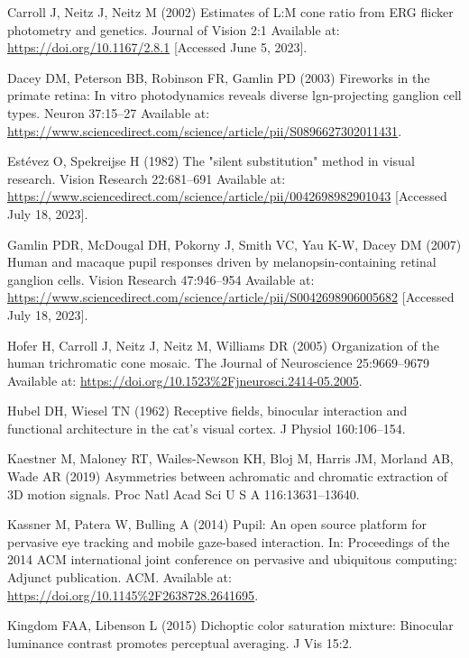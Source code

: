 \documentclass[
]{article}
\begin{document}
\leavevmode\hypertarget{ref-Carroll2002}{}%
Carroll J, Neitz J, Neitz M (2002) Estimates of L:M cone ratio from ERG flicker photometry and genetics. Journal of Vision 2:1 Available at: \url{https://doi.org/10.1167/2.8.1} {[}Accessed June 5, 2023{]}.

\leavevmode\hypertarget{ref-Dacey2003}{}%
Dacey DM, Peterson BB, Robinson FR, Gamlin PD (2003) Fireworks in the primate retina: In vitro photodynamics reveals diverse lgn-projecting ganglion cell types. Neuron 37:15--27 Available at: \url{https://www.sciencedirect.com/science/article/pii/S0896627302011431}.

\leavevmode\hypertarget{ref-Estevez1982}{}%
Estévez O, Spekreijse H (1982) The "silent substitution" method in visual research. Vision Research 22:681--691 Available at: \url{https://www.sciencedirect.com/science/article/pii/0042698982901043} {[}Accessed July 18, 2023{]}.

\leavevmode\hypertarget{ref-Gamlin2007}{}%
Gamlin PDR, McDougal DH, Pokorny J, Smith VC, Yau K-W, Dacey DM (2007) Human and macaque pupil responses driven by melanopsin-containing retinal ganglion cells. Vision Research 47:946--954 Available at: \url{https://www.sciencedirect.com/science/article/pii/S0042698906005682} {[}Accessed July 18, 2023{]}.

\leavevmode\hypertarget{ref-Hofer2005}{}%
Hofer H, Carroll J, Neitz J, Neitz M, Williams DR (2005) Organization of the human trichromatic cone mosaic. The Journal of Neuroscience 25:9669--9679 Available at: \url{https://doi.org/10.1523\%2Fjneurosci.2414-05.2005}.

\leavevmode\hypertarget{ref-Hubel1962}{}%
Hubel DH, Wiesel TN (1962) Receptive fields, binocular interaction and functional architecture in the cat's visual cortex. J Physiol 160:106--154.

\leavevmode\hypertarget{ref-Kaestner2019}{}%
Kaestner M, Maloney RT, Wailes-Newson KH, Bloj M, Harris JM, Morland AB, Wade AR (2019) Asymmetries between achromatic and chromatic extraction of 3D motion signals. Proc Natl Acad Sci U S A 116:13631--13640.

\leavevmode\hypertarget{ref-Kassner2014}{}%
Kassner M, Patera W, Bulling A (2014) Pupil: An open source platform for pervasive eye tracking and mobile gaze-based interaction. In: Proceedings of the 2014 ACM international joint conference on pervasive and ubiquitous computing: Adjunct publication. ACM. Available at: \url{https://doi.org/10.1145\%2F2638728.2641695}.

\leavevmode\hypertarget{ref-Kingdom2015}{}%
Kingdom FAA, Libenson L (2015) Dichoptic color saturation mixture: Binocular luminance contrast promotes perceptual averaging. J Vis 15:2.
\end{document}
